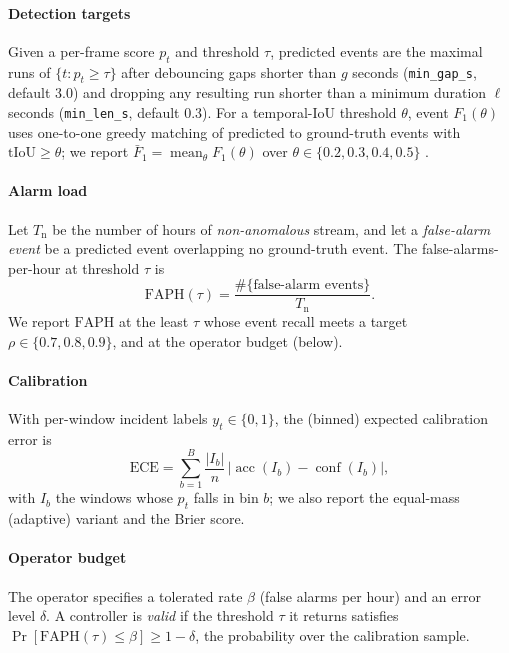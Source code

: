\documentclass[conference]{IEEEtran}
\newcommand{\faph}{\mathrm{FAPH}}
\newcommand{\ece}{\mathrm{ECE}}
\begin{document}
\paragraph{Detection targets}
Given a per-frame score $p_t$ and threshold $\tau$, predicted events are the
maximal runs of $\{t: p_t\ge\tau\}$ after debouncing gaps shorter than
$g$ seconds (\texttt{min\_gap\_s}, default $3.0$) and dropping any resulting
run shorter than a minimum duration $\ell$ seconds (\texttt{min\_len\_s},
default $0.3$). For a temporal-IoU threshold $\theta$, event $F_1(\theta)$ uses
one-to-one greedy matching of predicted to ground-truth events with
$\mathrm{tIoU}\ge\theta$; we report $\bar F_1=\operatorname{mean}_\theta
F_1(\theta)$ over $\theta\in\{0.2,0.3,0.4,0.5\}$ \cite{framestoevents2026}.

\paragraph{Alarm load}
Let $T_{\text{n}}$ be the number of hours of \emph{non-anomalous} stream, and
let a \emph{false-alarm event} be a predicted event overlapping no
ground-truth event. The false-alarms-per-hour at threshold $\tau$ is
\begin{equation}
\faph(\tau)=\frac{\#\{\text{false-alarm events}\}}{T_{\text{n}}}.
\end{equation}
We report $\faph$ at the least $\tau$ whose event recall meets a target
$\rho\in\{0.7,0.8,0.9\}$, and at the operator budget (below).

\paragraph{Calibration}
With per-window incident labels $y_t\in\{0,1\}$, the (binned) expected
calibration error is
\begin{equation}
\ece=\sum_{b=1}^{B}\frac{|I_b|}{n}\,\bigl|\operatorname{acc}(I_b)-\operatorname{conf}(I_b)\bigr|,
\end{equation}
with $I_b$ the windows whose $p_t$ falls in bin $b$; we also report the
equal-mass (adaptive) variant and the Brier score.

\paragraph{Operator budget}
The operator specifies a tolerated rate $\beta$ (false alarms per hour) and an
error level $\delta$. A controller is \emph{valid} if the threshold $\tau$ it
returns satisfies $\Pr[\faph(\tau)\le\beta]\ge 1-\delta$, the probability over
the calibration sample.
\end{document}
